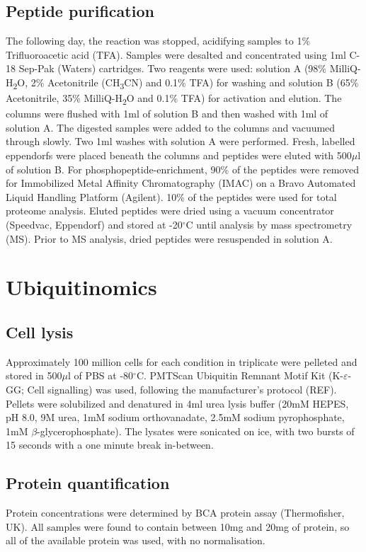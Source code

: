 \subsection{Peptide purification}
The following day, the reaction was stopped, acidifying samples to 1\% Trifluoroacetic acid (TFA). Samples were desalted and concentrated using 1ml C-18 Sep-Pak (Waters) cartridges. Two reagents were used: solution A (98\% MilliQ-H\textsubscript{2}O, 2\% Acetonitrile (CH\textsubscript{3}CN) and 0.1\% TFA) for washing and solution B (65\% Acetonitrile, 35\% MilliQ-H\textsubscript{2}O and 0.1\% TFA) for activation and elution. The columns were flushed with 1ml of solution B and then washed with 1ml of solution A. The digested samples were added to the columns and vacuumed through slowly. Two 1ml washes with solution A were performed. Fresh, labelled eppendorfs were placed beneath the columns and peptides were eluted with 500$\mu$l of solution B.
For phosphopeptide-enrichment, 90\% of the peptides were removed for Immobilized Metal Affinity Chromatography (IMAC) on a Bravo Automated Liquid Handling Platform (Agilent). 10\% of the peptides were used for total proteome analysis. Eluted peptides were dried using a vacuum concentrator (Speedvac, Eppendorf) and stored at -20$^{\circ}$C until analysis by mass spectrometry (MS). Prior to MS analysis, dried peptides were resuspended in solution A.


\section{Ubiquitinomics}
\subsection{Cell lysis}
Approximately 100 million cells for each condition in triplicate were pelleted and stored in 500$\mu$l of PBS at -80$^{\circ}$C. PMTScan Ubiquitin Remnant Motif Kit (K-$\varepsilon$-GG; Cell signalling) was used, following the manufacturer's protocol (REF).
Pellets were solubilized and denatured in 4ml urea lysis buffer (20mM HEPES, pH 8.0, 9M urea, 1mM sodium orthovanadate, 2.5mM sodium pyrophosphate, 1mM $\beta$-glycerophosphate). The lysates were sonicated on ice, with two bursts of 15 seconds with a one minute break in-between.

\subsection{Protein quantification}
Protein concentrations were determined by BCA protein assay (Thermofisher, UK). All samples were found to contain between 10mg and 20mg of protein, so all of the available protein was used, with no normalisation.

